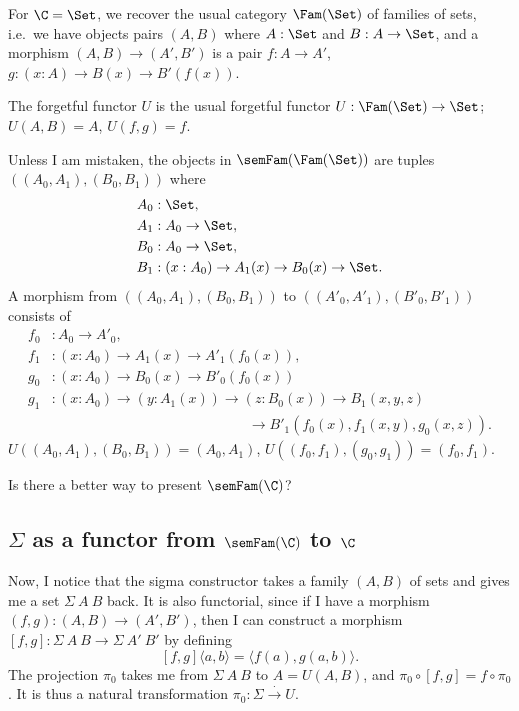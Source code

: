 \documentclass{article}
\begin{document}
\begin{example}[$\C = \Set$]
  For $\C = \Set$, we recover the usual category $\Fam(\Set)$
  of families of sets, i.e.\ we have objects pairs $(A, B)$ where $A :
  \Set$ and $B : A \to \Set$, and a morphism $(A, B) \to (A', B')$ is
  a pair $f : A \to A'$, $g : (x : A) \to B(x) \to B'(f(x))$.

  The forgetful functor $U$ is the usual forgetful functor $U :
  \Fam(\Set) \to \Set$; $U(A, B) = A$, $U(f, g) = f$.
\end{example}

\begin{example}[$\C = \Fam(\Set)$]
  Unless I am mistaken, the objects in $\semFam(\Fam(\Set))$ are
  tuples $((A_0, A_1), (B_0, B_1))$ where
  \begin{align*}
    A_0 &: \Set, \\
    A_1 &: A_0 \to \Set, \\
    B_0 &: A_0 \to \Set, \\
    B_1 &: (x : A_0) \to A_1(x) \to  B_0(x) \to \Set.
  \end{align*}
 A morphism from $((A_0, A_1), (B_0, B_1))$ to
  $((A'_0, A'_1), (B'_0, B'_1))$ consists of 
  \begin{align*}
    f_0 &: A_0 \to A'_0, \\
    f_1 &: (x : A_0) \to A_1(x) \to A'_1(f_0(x)), \\
    g_0 &: (x : A_0) \to B_0(x) \to B'_0(f_0(x)) \\
    g_1 &: (x : A_0) \to (y : A_1(x)) \to (z : B_0(x)) \to B_1(x, y, z) \\
    & \qquad \qquad\qquad \qquad\qquad \qquad\qquad \to B'_1(f_0(x), f_1(x, y), g_0(x, z)).
  \end{align*}
$U((A_0, A_1), (B_0, B_1)) = (A_0, A_1)$, $U((f_0, f_1), (g_0, g_1)) = (f_0, f_1)$.
\end{example}

\begin{question}
  Is there a better way to present $\semFam(\C)$?
\end{question}

\subsection{$\Sigma$ as a functor from $\semFam(\C)$ to $\C$}

Now, I notice that the sigma constructor takes a family $(A, B)$ of
sets and gives me a set $\Sigma\ A\ B$ back. It is also functorial,
since if I have a morphism $(f, g) : (A, B) \to (A', B')$, then I can
construct a morphism $[f, g] : \Sigma\ A\ B \to \Sigma\ A'\ B'$ by defining
\[
[f, g] \langle a, b\rangle = \langle f(a), g(a, b)\rangle.
\]
The projection $\pi_0$ takes me from $\Sigma\ A\ B$ to $A = U(A,B)$, and $\pi_0
\circ [f, g] = f \circ \pi_0$. It is thus a natural transformation
$\pi_0 : \Sigma \xrightarrow{\cdot} U$.
\end{document}
